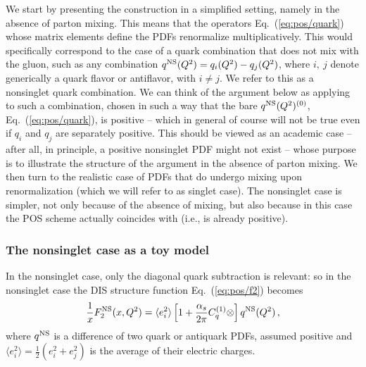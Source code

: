 We start by presenting the construction in a simplified setting,  namely in the
absence of parton mixing. 
This means that the operators Eq.~(\ref{eq:pos/quark}) whose matrix elements
define the PDFs renormalize multiplicatively.
This would specifically correspond to the case of a quark combination that does
not mix with the gluon, such as  any combination
$q^{{\textrm{NS}}}(Q^2)=q_i(Q^2)-q_j(Q^2)$, where $i,\>j$ denote generically a quark
flavor or antiflavor, with $i\not= j$.
We refer to this as a  nonsinglet quark combination. We can think of the
argument below as applying to such a combination,  chosen in such a way that 
the bare $q^{{\textrm{NS}}}(Q^2)^{(0)}$, Eq.~(\ref{eq:pos/quark}), is positive -- which
in general of course will not be true even if $q_i$ and $q_j$ are separately
positive. 
This should be viewed as an academic case -- after all, in principle, a
positive nonsinglet PDF might not exist -- whose purpose is to illustrate the
structure of the argument in the absence of parton mixing. 
We then turn to the realistic case of PDFs that do undergo mixing upon
renormalization (which we will refer to as singlet case).
The nonsinglet case is simpler, not only because of the absence of mixing, but
also because in  this case the POS scheme actually coincides with \msbar{}
(i.e., \msbar{} is already positive). 

\subsubsection{The nonsinglet case as a toy model}
\label{sec:nonsing}

In the nonsinglet case, only the diagonal quark subtraction is relevant: so in
the nonsinglet case the DIS structure function Eq.~(\ref{eq:pos/f2}) becomes
\begin{equation}\label{eq:pos/disfact}
 \frac{1}{x} F_2^{{\textrm{NS}}}(x,Q^2)= \langle e_i^2\rangle \left[1
 +\frac{\alpha_s}{2\pi}  C^{(1)}_q \otimes \right] q^{{\textrm{NS}}}(Q^2) \,,
\end{equation}
where $q^{{\textrm{NS}}}$ is a difference of two quark or antiquark PDFs, assumed
positive and
$\langle
e^2_i\rangle=\frac{1}{2} \left(e^2_i+e^2_j\right)$ is the average of
their electric charges. 

